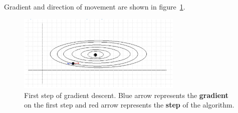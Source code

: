 Gradient and direction of movement are shown in figure~\ref{fig:prob9_contour_gd}.

\begin{figure}[htpb]
	\centering
	\includegraphics[width=0.7\textwidth]{../Problem 9/contour_gd.png}
	\caption{First step of gradient descent. Blue arrow represents the \textbf{gradient} on the first step and red arrow represents the \textbf{step} of the algorithm.}
	\label{fig:prob9_contour_gd}
\end{figure}
